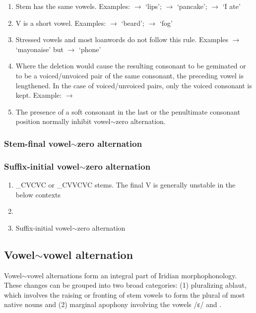 \begin{enumerate}
	\item Stem has the same vowels. Examples:  $\rightarrow$  `lips';  $\rightarrow$  `pancake';  $\rightarrow$  `I ate'
	\item V is a short vowel. Examples:  $\rightarrow$  `beard';  $\rightarrow$  `fog'
	\item Stressed vowels and most loanwords do not follow this rule. Examples  $\rightarrow$  `mayonaise' but  $\rightarrow$  `phone'
	\item Where the deletion would cause the resulting consonant to be geminated or to be a voiced/unvoiced pair of the same consonant, the preceding vowel is lengthened. In the case of voiced/unvoiced pairs, only the voiced consonant is kept. Example:  $\rightarrow$ 
	\item The presence of a soft consonant in the last or the penultimate consonant position normally inhibit vowel$\sim$zero alternation.
\end{enumerate}


\subsubsection{Stem-final vowel$\sim$zero alternation}

\subsubsection{Suffix-initial vowel$\sim$zero alternation}

\begin{enumerate}
	\item \_CVCVC or \_CVVCVC stems. The final V is generally unstable in the below contexts

	\item
	\item Suffix-initial vowel$\sim$zero alternation
\end{enumerate}

\subsection{Vowel$\sim$vowel alternation}
\par Vowel$\sim$vowel alternations form an integral part of Iridian morphophonology. These changes can be grouped into two broad categories: (1) pluralizing ablaut, which involves the raising or fronting of stem vowels to form the plural of most native nouns and (2) marginal apophony involving the vowels /ɛ/ and .

